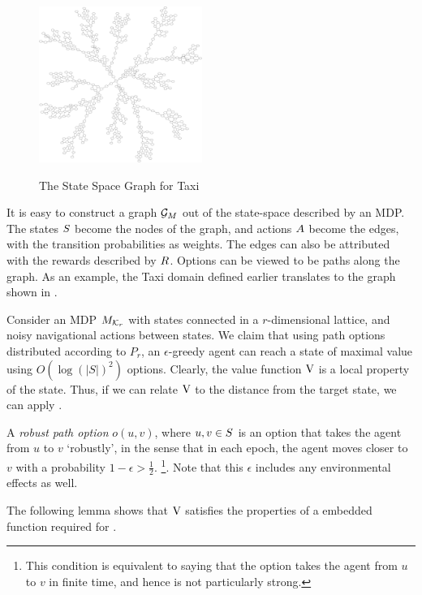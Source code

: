 \begin{figure}[th]
    \centering
    \includegraphics[height=2in]{figures/taxi1}
    \label{fig:taxi-graph}
    \caption{The State Space Graph for Taxi}
\end{figure}

It is easy to construct a graph $\mathcal{G}_{M}$ out of the state-space
described by an MDP. The states $S$ become the nodes of the graph,
and actions $A$ become the edges, with the transition
probabilities as weights. The edges can also be attributed with the
rewards described by $R$. Options can be viewed to be paths along
the graph. As an example, the Taxi domain defined earlier translates to
the graph shown in .

Consider an MDP $M_{\mathcal{K}_r}$ with states connected in
a $r$-dimensional lattice, and noisy navigational actions between
states. We claim that using path options distributed according to $P_r$,
an $\epsilon$-greedy agent can reach a state of maximal value using
$O(\log(|S|)^2)$ options. Clearly, the value function $\operatorname{V}$ is a local
property of the state. Thus, if we can relate $\operatorname{V}$ to the distance from
the target state, we can apply .

\begin{definition}
    A {\em robust path option} $o(u,v)$, where $u,v \in S$ is an
    option that takes the agent from $u$ to $v$ `robustly', in the
    sense that in each epoch, the agent moves closer to $v$ with a
    probability $1-\epsilon > \frac{1}{2}$. \footnote{This condition
    is equivalent to saying that the option takes the agent from $u$
    to $v$ in finite time, and hence is not particularly strong.}.
    Note that this $\epsilon$ includes any environmental effects as
    well.
\end{definition}

The following lemma shows that $\operatorname{V}$ satisfies the properties of a
embedded function required for . 

